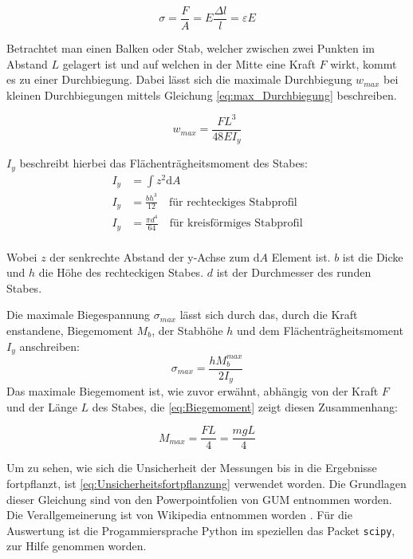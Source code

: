 \documentclass[11pt,ngerman]{scrartcl}
\begin{document}
\begin{equation}
    \label{eq:Dehnung_Spannung}
    \sigma = \frac{F}{A} = E\frac{\Delta l}{l} = \varepsilon E
\end{equation}

Betrachtet man einen Balken oder Stab, welcher zwischen zwei Punkten im Abstand
$L$ gelagert ist und auf welchen in der Mitte eine Kraft $F$ wirkt, kommt es zu
einer Durchbiegung.  Dabei lässt sich die maximale Durchbiegung $w_{max}$ bei
kleinen Durchbiegungen mittels Gleichung \ref{eq:max_Durchbiegung} beschreiben.

\begin{equation}
    \label{eq:max_Durchbiegung}
    w_{max} = \frac{FL^3}{48EI_y}
\end{equation}

$I_y$ beschreibt hierbei das Flächenträgheitsmoment des Stabes: 
\begin{align}
    I_y &= \int z^2 \text{d}A \\
    I_y &= \frac{bh^3}{12} \quad  \text{für rechteckiges Stabprofil}  \label{eq:Flaechentraegheitsmoment_Rechteck} \\
    I_y &= \frac{\pi d^4}{64}  \quad \text{für kreisförmiges Stabprofil} \label{eq:Flaechentraegheitsmoment_Kreis} \\
\end{align}

Wobei $z$ der senkrechte Abstand der y-Achse zum $\text{d}A$ Element ist. $b$ ist die 
Dicke und $h$ die Höhe des rechteckigen Stabes. $d$ ist der Durchmesser
des runden Stabes.

Die maximale Biegespannung $\sigma_{max}$ lässt sich durch das, durch die Kraft 
enstandene, Biegemoment $M_b$, der Stabhöhe $h$ und dem Flächenträgheitsmoment $I_y$
anschreiben:
\begin{equation}
    \label{eq:Spannung_max}
    \sigma_{max} = \frac{hM^{max}_b}{2I_y}
\end{equation}
Das maximale Biegemoment ist, wie zuvor erwähnt, abhängig von der Kraft $F$ und
der Länge $L$ des Stabes, die \autoref{eq:Biegemoment} zeigt diesen Zusammenhang:

\begin{equation}
    \label{eq:Biegemoment}
    M_{max} = \frac{FL}{4} = \frac{mgL}{4}
\end{equation}

Um zu sehen, wie sich die Unsicherheit der Messungen bis in die Ergebnisse 
fortpflanzt, ist \autoref{eq:Unsicherheitsfortpflanzung} verwendet worden.
Die Grundlagen dieser Gleichung sind von den Powerpointfolien von 
GUM entnommen worden.\cite{WolfgangKessel2004} Die Verallgemeinerung ist von Wikipedia entnommen
worden \cite{2020Fehler}.
Für die Auswertung ist die Progammiersprache Python im speziellen das 
Packet \verb#scipy#, zur Hilfe genommen worden.
\end{document}
